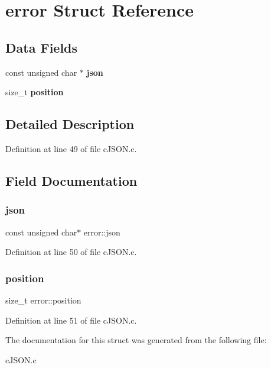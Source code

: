 \hypertarget{structerror}{}\section{error Struct Reference}
\label{structerror}
\subsection*{Data Fields}
\begin{DoxyCompactItemize}
\item 
\mbox{\label{structerror_a9b123855d5dd48e86de846588462b39f}} 
const unsigned char $\ast$ {\bfseries json}
\item 
\mbox{\label{structerror_a24de70a4d517ab351d80c18582cadb66}} 
size\+\_\+t {\bfseries position}
\end{DoxyCompactItemize}


\subsection{Detailed Description}


Definition at line 49 of file c\+J\+S\+O\+N.\+c.



\subsection{Field Documentation}
\mbox{\label{structerror_a9b123855d5dd48e86de846588462b39f}} 
\subsubsection{\texorpdfstring{json}{json}}
{\footnotesize\ttfamily const unsigned char$\ast$ error\+::json}



Definition at line 50 of file c\+J\+S\+O\+N.\+c.

\mbox{\label{structerror_a24de70a4d517ab351d80c18582cadb66}} 
\subsubsection{\texorpdfstring{position}{position}}
{\footnotesize\ttfamily size\+\_\+t error\+::position}



Definition at line 51 of file c\+J\+S\+O\+N.\+c.



The documentation for this struct was generated from the following file\+:\begin{DoxyCompactItemize}
\item 
c\+J\+S\+O\+N.\+c\end{DoxyCompactItemize}
